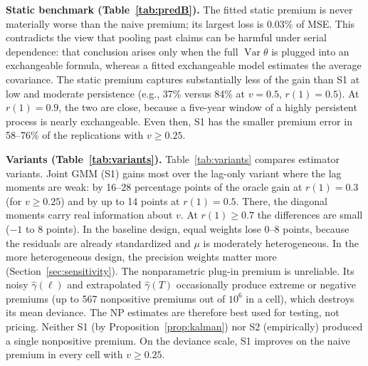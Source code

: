 \documentclass[mathematics,article,submit,moreauthors]{Definitions/mdpi}
\DeclareMathOperator{\Var}{Var}
\begin{document}
\textbf{Static benchmark (Table~\ref{tab:predB}).} The fitted static premium is never materially worse than the naive premium; its largest loss is 0.03\% of MSE. This contradicts the view that pooling past claims can be harmful under serial dependence: that conclusion arises only when the full $\Var\theta$ is plugged into an exchangeable formula, whereas a fitted exchangeable model estimates the average covariance. The static premium captures substantially less of the gain than S1 at low and moderate persistence (e.g., 37\% versus 84\% at $v=0.5$, $r(1)=0.5$). At $r(1)=0.9$, the two are close, because a five-year window of a highly persistent process is nearly exchangeable. Even then, S1 has the smaller premium error in 58--76\% of the replications with $v\ge0.25$.

\textbf{Variants (Table~\ref{tab:variants}).} Table~\ref{tab:variants} compares estimator variants. Joint GMM (S1) gains most over the lag-only variant where the lag moments are weak: by 16--28 percentage points of the oracle gain at $r(1)=0.3$ (for $v\ge0.25$) and by up to 14 points at $r(1)=0.5$. There, the diagonal moments carry real information about $v$. At $r(1)\ge0.7$ the differences are small ($-1$ to $8$ points). In the baseline design, equal weights lose 0--8 points, because the residuals are already standardized and $\mu$ is moderately heterogeneous. In the more heterogeneous design, the precision weights matter more (Section~\ref{sec:sensitivity}). The nonparametric plug-in premium is unreliable. Its noisy $\hat\gamma(\ell)$ and extrapolated $\hat\gamma(T)$ occasionally produce extreme or negative premiums (up to 567 nonpositive premiums out of $10^6$ in a cell), which destroys its mean deviance. The NP estimates are therefore best used for testing, not pricing. Neither S1 (by Proposition~\ref{prop:kalman}) nor S2 (empirically) produced a single nonpositive premium. On the deviance scale, S1 improves on the naive premium in every cell with $v\ge0.25$.
\end{document}
